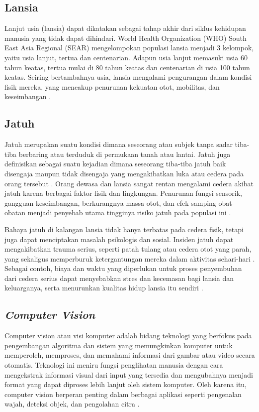 \subsection{Lansia} \label{II.Lansia}
Lanjut usia (lansia) dapat dikatakan sebagai tahap akhir dari siklus kehidupan manusia yang tidak dapat dihindari. World Health Organization (WHO) South East Asia Regional (SEAR) mengelompokan populasi lansia menjadi 3 kelompok, yaitu usia lanjut, tertua dan centenarian. Adapun usia lanjut memasuki usia 60 tahun keatas, tertua mulai di 80 tahun keatas dan centenarian di usia 100 tahun keatas. Seiring bertambahnya usia, lansia mengalami pengurangan dalam kondisi fisik mereka, yang mencakup penurunan kekuatan otot, mobilitas, dan keseimbangan \cite{Gusti2023}. \par

\subsection{Jatuh} \label{II.Jatuh}
Jatuh merupakan suatu kondisi dimana seseorang atau subjek tanpa sadar tiba-tiba berbaring atau terduduk di permukaan tanah atau lantai. Jatuh juga definisikan sebagai suatu kejadian dimana seseorang tiba-tiba jatuh baik disengaja maupun tidak disengaja yang mengakibatkan luka atau cedera pada orang tersebut \cite{Forrest2012}. Orang dewasa dan lansia sangat rentan mengalami cedera akibat jatuh karena berbagai faktor fisik dan lingkungan. Penurunan fungsi sensorik, gangguan keseimbangan, berkurangnya massa otot, dan efek samping obat-obatan menjadi penyebab utama tingginya risiko jatuh pada populasi ini \cite{Colon2024}. \par

Bahaya jatuh di kalangan lansia tidak hanya terbatas pada cedera fisik, tetapi juga dapat menciptakan masalah psikologis dan sosial. Insiden jatuh dapat mengakibatkan trauma serius, seperti patah tulang atau cedera otot yang parah, yang sekaligus memperburuk ketergantungan mereka dalam aktivitas sehari-hari \cite{Jatmiko2023}. Sebagai contoh, biaya dan waktu yang diperlukan untuk proses penyembuhan dari cedera serius dapat menyebabkan stres dan kecemasan bagi lansia dan keluarganya, serta menurunkan kualitas hidup lansia itu sendiri \cite{Solihin2023}. \par

\subsection{\textit{Computer Vision}} \label{II.computer vision}
Computer vision atau visi komputer adalah bidang teknologi yang berfokus pada pengembangan algoritma dan sistem yang memungkinkan komputer untuk memperoleh, memproses, dan memahami informasi dari gambar atau video secara otomatis. Teknologi ini meniru fungsi penglihatan manusia dengan cara mengekstrak informasi visual dari input yang tersedia dan mengubahnya menjadi format yang dapat diproses lebih lanjut oleh sistem komputer. Oleh karena itu, computer vision berperan penting dalam berbagai aplikasi seperti pengenalan wajah, deteksi objek, dan pengolahan citra  \cite{Negoro2023}. \par

